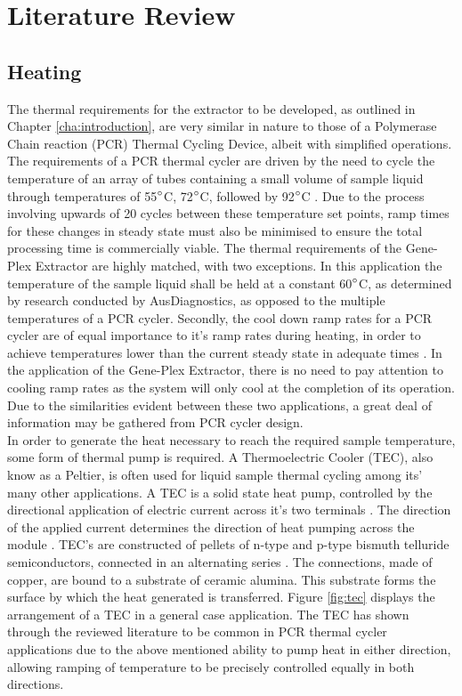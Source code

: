 \chapter{Literature Review}
\label{cha:literaturereview}

\section{Heating}

The thermal requirements for the extractor to be developed, as outlined in Chapter \ref{cha:introduction}, are very similar in nature to those of a Polymerase Chain reaction (PCR) Thermal Cycling Device, albeit with simplified operations. The requirements of a PCR thermal cycler are driven by the need to cycle the temperature of an array of tubes containing a small volume of sample liquid through temperatures of 55$\degree$C, 72$\degree$C, followed by 92$\degree$C \cite{14405884}. Due to the process involving upwards of 20 cycles between these temperature set points, ramp times for these changes in steady state must also be minimised to ensure the total processing time is commercially viable. The thermal requirements of the Gene-Plex Extractor are highly matched, with two exceptions. In this application the temperature of the sample liquid shall be held at a constant 60$\degree$C, as determined by research conducted by AusDiagnostics, as opposed to the multiple temperatures of a PCR cycler. Secondly, the cool down ramp rates for a PCR cycler are of equal importance to it's ramp rates during heating, in order to achieve temperatures lower than the current steady state in adequate times \cite{2563996}\cite{15156909}. In the application of the Gene-Plex Extractor, there is no need to pay attention to cooling ramp rates as the system will only cool at the completion of its operation. Due to the similarities evident between these two applications, a great deal of information may be gathered from PCR cycler design.\\

In order to generate the heat necessary to reach the required sample temperature, some form of thermal pump is required. A Thermoelectric Cooler (TEC), also know as a Peltier, is often used for liquid sample thermal cycling \cite{12436620} among its' many other applications. A TEC is a solid state heat pump, controlled by the directional application of electric current across it's two terminals \cite{20160801988967}. The direction of the applied current determines the direction of heat pumping across the module \cite{20160801988967}. TEC's are constructed of pellets of n-type and p-type bismuth telluride semiconductors, connected in an alternating series \cite{6464884}. The connections, made of copper, are bound to a substrate of ceramic alumina. This substrate forms the surface by which the heat generated is transferred. Figure \ref{fig:tec} displays the arrangement of a TEC in a general case application. The TEC has shown through the reviewed literature to be common in PCR thermal cycler applications due to the above mentioned ability to pump heat in either direction, allowing ramping of temperature to be precisely controlled equally in both directions.\\

